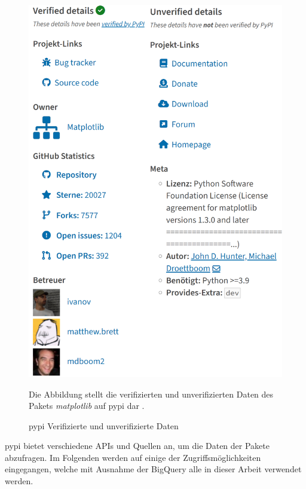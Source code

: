 \begin{figure}
    \centering
    \includegraphics[width=\textwidth]{bilder/pypi.png}
    \caption{\gls{pypi} Verifizierte und unverifizierte Daten}
    \label{fig:pypi_verified_unverified_details}
    \small
    Die Abbildung stellt die verifizierten und unverifizierten Daten des Pakets \emph{matplotlib} auf \gls{pypi} dar \autocite{python_software_foundation_pypi_2024}.
\end{figure}

\gls{pypi} bietet verschiedene APIs und Quellen an, um die Daten der Pakete abzufragen.
Im Folgenden werden auf einige der Zugriffsmöglichkeiten eingegangen, welche mit Ausnahme der BigQuery alle in dieser Arbeit verwendet werden.

